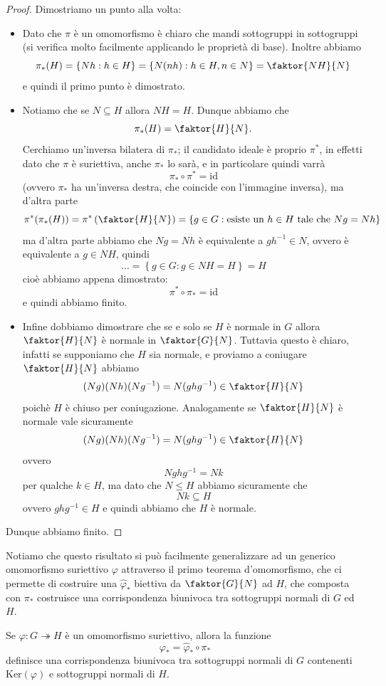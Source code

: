 \documentclass[11pt]{scrartcl}
\newcommand{\surj}{\twoheadrightarrow}
\renewcommand{\ker}[1]{\text{Ker}\!\left(#1\right)}
\begin{document}
	\begin{proof}
		Dimostriamo un punto alla volta:
		\begin{itemize}
			\item Dato che $\pi$ è un omomorfismo è chiaro che mandi sottogruppi in sottogruppi (si verifica molto facilmente applicando le proprietà di base). Inoltre abbiamo
			$$\pi_*(H)=\left\{Nh:h\in H\right\}=\left\{N(nh):h\in H,n\in N\right\}=\faktor{NH}{N}$$
			e quindi il primo punto è dimostrato.
			\item Notiamo che se $N\subseteq H$ allora $NH=H$. Dunque abbiamo che 
			$$\pi_*(H)=\faktor{H}{N}.$$
			Cerchiamo un'inversa bilatera di $\pi_*$; il candidato ideale è proprio $\pi^*$, in effetti dato che $\pi$ è suriettiva, anche $\pi_*$ lo sarà, e in particolare quindi varrà
			$$\pi_*\circ \pi^*=\text{id}$$
			(ovvero $\pi_*$ ha un'inversa destra, che coincide con l'immagine inversa), ma d'altra parte
			$$\pi^*(\pi_*(H))=\pi^*\left(\faktor{H}{N}\right)=\left\{g\in G:\text{esiste un $h\in H$ tale che } Ng=Nh\right\}$$
			ma d'altra parte abbiamo che $Ng=Nh$ è equivalente a $gh^{-1}\in N$, ovvero è equivalente a $g\in NH$, quindi
			$$\dots=\left\{g\in G: g\in NH=H\right\}=H$$
			cioè abbiamo appena dimostrato:
			$$\pi^*\circ \pi_*=\text{id}$$
			e quindi abbiamo finito.
			\item Infine dobbiamo dimostrare che se e solo se $H$ è normale in $G$ allora $\faktor{H}{N}$ è normale in $\faktor{G}{N}$. Tuttavia questo è chiaro, infatti se supponiamo che $H$ sia normale, e proviamo a coniugare $\faktor{H}{N}$ abbiamo
			$$(Ng)(Nh)(Ng^{-1})=N(ghg^{-1})\in \faktor{H}{N}$$
			poichè $H$ è chiuso per coniugazione. Analogamente se $\faktor{H}{N}$ è normale vale sicuramente
			$$(Ng)(Nh)(Ng^{-1})=N(ghg^{-1})\in \faktor{H}{N}$$
			ovvero 
			$$Nghg^{-1}=Nk$$
			per qualche $k\in H$, ma dato che $N\le H$ abbiamo sicuramente che $$Nk\subseteq H$$
			ovvero $ghg^{-1}\in H$ e quindi abbiamo che $H$ è normale.
		\end{itemize}
		Dunque abbiamo finito.
	\end{proof}
	Notiamo che questo risultato si può facilmente generalizzare ad un generico omomorfismo suriettivo $\varphi$ attraverso il primo teorema d'omomorfismo, che ci permette di costruire una $\hat{\varphi}_*$ biettiva da $\faktor{G}{N}$ ad $H$, che composta con $\pi_*$ costruisce una corrispondenza biunivoca tra sottogruppi normali di $G$ ed $H$. 
	\begin{corollary}
		Se $\varphi:G\surj H$ è un omomorfismo suriettivo, allora la funzione 
		$$\varphi_*=\hat{\varphi}_*\circ \pi_*$$
		definisce una corrispondenza biunivoca tra sottogruppi normali di $G$ contenenti $\ker{\varphi}$ e sottogruppi normali di $H$.
	\end{corollary}
\end{document}
